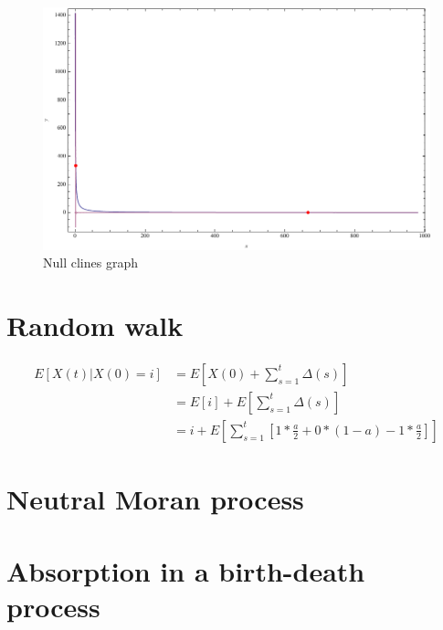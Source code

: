 \begin{figure}[htbp]
\centering
\includegraphics[scale=0.6]{./images/graph02}
\caption{Null clines graph}
\label{fig:graph02}
\end{figure}


\setcounter{chapter}{3}
\setcounter{section}{0}
\section{Random walk}

\begin{align*}
E[X(t) | X(0)  = i ] &= E[X(0) + \sum\limits_{s=1}^{t} \Delta(s) ] \\
&= E[i] + E\left[  \sum\limits_{s=1}^{t} \Delta(s) \right] \\
&= i + E \left[ \sum\limits_{s=1}^{t} \left[1 * \frac{a}{2} + 0 * (1-a) -1*\frac{a}{2}\right] \right]
\end{align*}


\setcounter{chapter}{4}
\setcounter{section}{0}
\section{Neutral Moran process}


\setcounter{chapter}{5}
\setcounter{section}{0}
\section{Absorption in a birth-death process}

